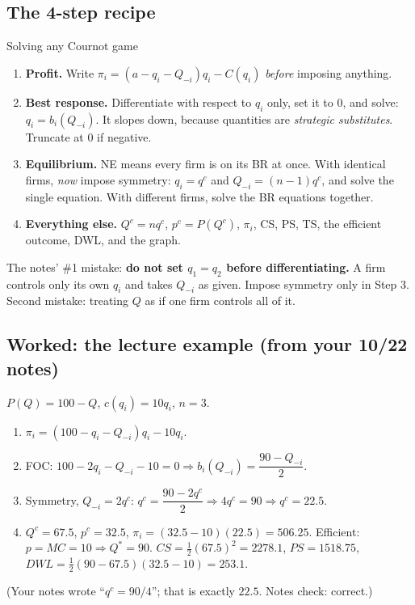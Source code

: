 \documentclass[11pt]{article}
\begin{document}
\subsection{The 4-step recipe}
\begin{workbox}{Solving any Cournot game}
\begin{enumerate}[label=\textbf{Step \arabic*.},leftmargin=4.2em]
\item \textbf{Profit.} Write $\pi_i=(a-q_i-Q_{-i})q_i-C(q_i)$ \emph{before} imposing anything.
\item \textbf{Best response.} Differentiate with respect to $q_i$ only, set it to 0, and solve: $q_i=b_i(Q_{-i})$. It slopes down, because quantities are \emph{strategic substitutes}. Truncate at 0 if negative.
\item \textbf{Equilibrium.} NE means every firm is on its BR at once. With identical firms, \emph{now} impose symmetry: $q_i=q^c$ and $Q_{-i}=(n-1)q^c$, and solve the single equation. With different firms, solve the BR equations together.
\item \textbf{Everything else.} $Q^c=nq^c$, $p^c=P(Q^c)$, $\pi_i$, CS, PS, TS, the efficient outcome, DWL, and the graph.
\end{enumerate}
\end{workbox}
\begin{tipbox}
The notes' \#1 mistake: \textbf{do not set $q_1=q_2$ before differentiating.} A firm controls only its own $q_i$ and takes $Q_{-i}$ as given. Impose symmetry only in Step 3. Second mistake: treating $Q$ as if one firm controls all of it.
\end{tipbox}

\subsection{Worked: the lecture example (from your 10/22 notes)}
$P(Q)=100-Q$, $c(q_i)=10q_i$, $n=3$.
\begin{enumerate}
\item $\pi_i=(100-q_i-Q_{-i})q_i-10q_i$.
\item FOC: $100-2q_i-Q_{-i}-10=0\Rightarrow b_i(Q_{-i})=\dfrac{90-Q_{-i}}{2}$.
\item Symmetry, $Q_{-i}=2q^c$: $q^c=\dfrac{90-2q^c}{2}\Rightarrow4q^c=90\Rightarrow q^c=22.5$.
\item $Q^c=67.5$, $p^c=32.5$, $\pi_i=(32.5-10)(22.5)=506.25$. Efficient: $p=MC=10\Rightarrow Q^*=90$. $CS=\tfrac12(67.5)^2=2278.1$, $PS=1518.75$, $DWL=\tfrac12(90-67.5)(32.5-10)=253.1$.
\end{enumerate}
(Your notes wrote ``$q^c=90/4$''; that is exactly $22.5$. Notes check: correct.)
\end{document}
